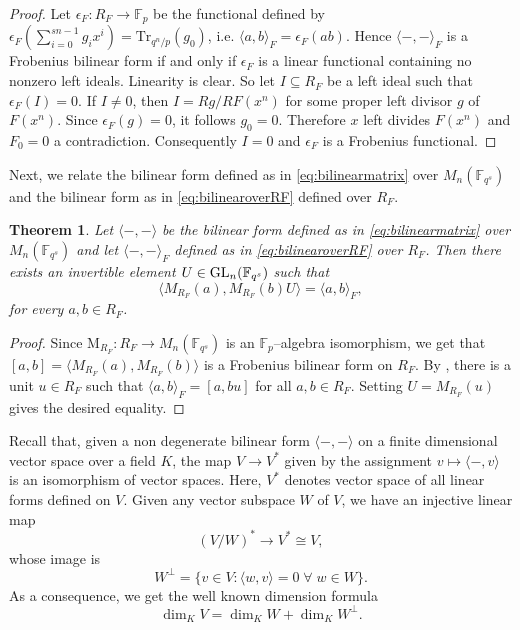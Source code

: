 \documentclass[a4paper, 11pt]{article}
\newtheorem{theorem}{Theorem}[section]
\newcommand{\F}{{\mathbb F}}
\newcommand{\Tr}{{\mathrm{Tr}}}
\newcommand{\GL}{\hbox{{\rm GL}}}
\newcommand{\M}{\mathrm{M}}
\begin{document}
\begin{proof}
Let \(\epsilon_F:R_F \to \F_p\) be the functional defined by \(\epsilon_F\left(\sum_{i=0}^{sn-1} g_i x^i\right) = \Tr_{q^n/p}(g_0)\), i.e. \(\langle a,b \rangle_F = \epsilon_F(ab)\). Hence \(\langle -,- \rangle_F\) is a Frobenius bilinear form if and only if \(\epsilon_F\) is a linear functional containing no nonzero left ideals. Linearity is clear. So let \(I \subseteq R_F\) be a left ideal such that \(\epsilon_F(I) = 0\). If \(I \neq 0\), then \(I = Rg/RF(x^n)\) for some proper left divisor \(g\) of \(F(x^n)\). Since \(\epsilon_F(g) = 0\), it follows \(g_0 = 0\). Therefore \(x\) left divides \(F(x^n)\) and \(F_0 = 0\) a contradiction. Consequently \(I = 0\) and \(\epsilon_F\) is a Frobenius functional. 
\end{proof}




Next, we relate the bilinear form defined as in \eqref{eq:bilinearmatrix} over $M_n(\F_{q^s})$ and the bilinear form as in \eqref{eq:bilinearoverRF} defined over $R_F$. 

\begin{theorem} \label{th:correspondencebilinear}
Let $\langle -,- \rangle$ be the bilinear form defined as in \eqref{eq:bilinearmatrix} over $M_n(\F_{q^s})$ and let $\langle -, -\rangle_F$ defined as in \eqref{eq:bilinearoverRF} over $R_F$.
Then there exists an invertible element $U \in \GL_n(\F_{q^s})$ such that 
\[
\langle M_{R_F}(a), M_{R_F}(b) U  \rangle= \langle a,b \rangle_F,
\]
for every $a,b \in R_F$.
\end{theorem}

\begin{proof}
Since \(\M_{R_F} : R_F \rightarrow M_n(\F_{q^s}) \) is an \(\F_p\)--algebra isomorphism, we get that \([a,b] = \langle M_{R_F}(a), M_{R_F}(b)\rangle \) is a Frobenius bilinear form on \(R_F\). By \cite[Th. 3.1]{jans1959frobenius}, there is a unit \(u \in R_F\) such that
\(\langle a, b\rangle_F = [a,bu]\) for all \(a,b \in R_F\). Setting \(U = M_{R_F}(u)\) gives the desired equality. 
\end{proof}

Recall that, given a non degenerate  bilinear form \(\langle -,- \rangle\) on a finite dimensional vector space over a field \(K\), the map \(V \to V^*\) given by the assignment \(v \mapsto \langle -,v\rangle\) is an isomorphism of vector spaces. Here, \(V^*\) denotes vector space of all linear forms defined on \(V\). Given any vector subspace \(W\) of \(V\), we have an injective linear map
\[
\left( V/W\right)^* \to V^* \cong V,
\]
whose image is \[W^\perp = \{v \in V : \langle w,v \rangle = 0 \; \forall\;  w \in W\}.\] As a consequence, we get the well known dimension formula
\begin{equation} \label{eq:dimensionalformula}
\dim_K V = \dim_K W + \dim_K W^\perp.
\end{equation}
 
\end{document}
